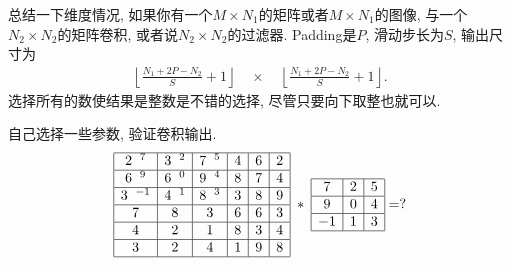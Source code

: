 总结一下维度情况, 如果你有一个$M\times N_1$的矩阵或者$M\times N_1$的图像, 与一个$N_2\times N_2$的矩阵卷积, 或者说$N_2\times N_2$的过滤器. Padding是$P$, 滑动步长为$S$, 输出尺寸为
\begin{align*}
    \left\lfloor\frac{N_1+2 P-N_2}{S}+1\right\rfloor \quad \times \quad\left\lfloor\frac{N_1+2 P-N_2}{S}+1\right\rfloor.
\end{align*}
选择所有的数使结果是整数是不错的选择, 尽管只要向下取整也就可以.
\begin{example}
自己选择一些参数, 验证卷积输出.
\begin{align*}
\begin{array}{|c|c|c|c|c|c|}
\hline 2\;\;^{7} & 3\;\;^{2} & 7\;\;^{5} & 4 & 6 & 2 \\
\hline 6\;\;^{9} & 6\;\;^{0} & 9\;\;^{4} & 8 & 7 & 4 \\
\hline 3\;\;^{-1} & 4\;\;^{1} & 8\;\;^{3} & 3 & 8 & 9 \\
\hline 7 & 8 & 3 & 6 & 6 & 3 \\
\hline 4 & 2 & 1 & 8 & 3 & 4 \\
\hline 3 & 2 & 4 & 1 & 9 & 8 \\
\hline
\end{array}
\;*\;
\begin{array}{|c|c|c|}
\hline 7 & 2 & 5 \\
\hline 9 & 0 & 4 \\
\hline-1 & 1 & 3 \\
\hline
\end{array}
=?
\end{align*}
\end{example}

